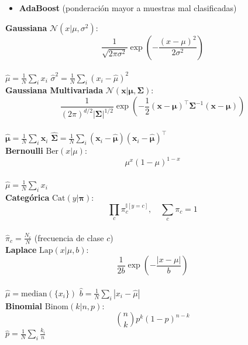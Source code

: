 \documentclass[11pt, a4paper]{article}
\newcommand{\x}{\mathbf{x}}
\begin{document}
\begin{minipage}[t]{0.325\textwidth}
\begin{tcolorbox}[formulabox=Ensemble Methods, colframe=softSlate]
\begin{itemize}
            \begin{itemize}
                \item XGBoost, LightGBM, CatBoost
            \end{itemize}
            \item \textbf{AdaBoost} (ponderación mayor a muestras mal clasificadas)
        \end{itemize}
    \end{tcolorbox}
    \begin{tcolorbox}[formulabox=Distributions + MLE estimators, colframe=softTeal]
        \textbf{Gaussiana} $\mathcal{N}(x|\mu,\sigma^2)$:
        $$\frac{1}{\sqrt{2\pi\sigma^2}}\exp\!\left(-\frac{(x-\mu)^2}{2\sigma^2}\right)$$\\
        $\hat{\mu} = \tfrac{1}{N}\sum_i x_i$ \quad
        $\hat{\sigma}^2 = \tfrac{1}{N}\sum_i (x_i - \hat{\mu})^2$\\[2pt]
        \textbf{Gaussiana Multivariada} $\mathcal{N}(\x|\boldsymbol{\mu},\boldsymbol{\Sigma})$:
        $$\frac{1}{(2\pi)^{d/2}|\boldsymbol{\Sigma}|^{1/2}}\exp\!\left(-\frac{1}{2}(\x-\boldsymbol{\mu})^\top\boldsymbol{\Sigma}^{-1}(\x-\boldsymbol{\mu})\right)$$\\
         $\hat{\boldsymbol{\mu}} = \tfrac{1}{N}\sum_i \x_i$ \quad
        $\hat{\boldsymbol{\Sigma}} = \tfrac{1}{N}\sum_i (\x_i-\hat{\boldsymbol{\mu}})(\x_i-\hat{\boldsymbol{\mu}})^\top$\\[2pt]
        \textbf{Bernoulli} $\text{Ber}(x|\mu)$: 
        $$\mu^x(1-\mu)^{1-x}$$\\
        $\hat{\mu} = \tfrac{1}{N}\sum_i x_i$ \\[2pt]
        \textbf{Categórica} $\text{Cat}(y|\boldsymbol{\pi})$: 
        $$\prod_c \pi_c^{\mathbb{I}[y=c]},\quad \sum_c\pi_c=1$$\\
        $\hat{\pi}_c = \tfrac{N_c}{N}$ \quad (frecuencia de clase $c$)\\[2pt]
        \textbf{Laplace} $\text{Lap}(x|\mu,b)$: 
        $$\frac{1}{2b}\exp\!\left(-\frac{|x-\mu|}{b}\right)$$\\
        $\hat{\mu} = \text{median}(\{x_i\})$ \quad
        $\hat{b} = \tfrac{1}{N}\sum_i |x_i - \hat{\mu}|$\\[2pt]
        \textbf{Binomial} $\text{Binom}(k|n,p)$: 
        $$\binom{n}{k}p^k(1-p)^{n-k}$$
        $\hat{p} = \tfrac{1}{N}\sum_i \tfrac{k_i}{n}$
    \end{tcolorbox}
\end{minipage}
\hfill
\end{document}
